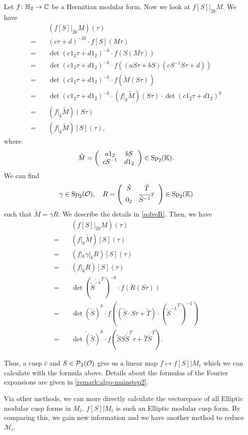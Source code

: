 \begin{prelim}
Let $f \colon \mathbb{H}_2 \rightarrow \mathbb{C}$ be a Hermitian modular form. Now we look at $f[S] |_{2k} M$. We have
\begin{align*}
& (f[S] |_{2k} M) (\tau) \\
=\quad & (c \tau + d)^{-2k} \cdot f[S](M \tau) \\
=\quad & \det(c 1_2 \tau + d 1_2)^{-k} \cdot f(S (M \tau)) \\
=\quad & \det(c 1_2 \tau + d 1_2)^{-k} \cdot f( (a S \tau + b S) ( c S^{-1} S \tau + d) ) \\
=\quad & \det(c 1_2 \tau + d 1_2)^{-k} \cdot f( \tilde{M} (S \tau) ) \\
=\quad & \det(c 1_2 \tau + d 1_2)^{-k} \cdot (f |_k \tilde{M}) (S \tau) \cdot \det(c 1_2 \tau + d 1_2)^{k} \\
=\quad & ( f |_k \tilde{M} ) (S \tau) \\
=\quad & ( f |_k \tilde{M} )[S] (\tau) ,
\end{align*}
where
\[ \tilde{M} = \left( \begin{array}{cc} a1_2 & bS \\ cS^{-1} & d1_2 \end{array} \right) \in \operatorname{Sp}_2(\mathbb{K}) . \]
%
We can find
\[ \gamma \in \operatorname{Sp}_2(\mathcal{O}), \quad R = \left( \begin{array}{cc} \tilde{S} & \tilde{T} \\ 0_2 & \overline{\tilde{S}^{-1}}^T \end{array} \right) \in \operatorname{Sp}_2(\mathbb{K}) \]
such that $\tilde{M} = \gamma R$. We describe the details in \cref{solveR}.
Then, we have
\begin{align*}
& (f[S] |_{2k} M) (\tau) \\
=\quad& ( f |_k \tilde{M} )[S] (\tau) \\
=\quad& ( f |_k \gamma |_k R  )[S] (\tau) \\
=\quad& (f |_k R) [S] (\tau) \\
=\quad& \det\left(\overline{\tilde{S}^{-1}}^T\right)^{-k} \cdot f(R  (S \tau)) \\
=\quad& \overline{\det(\tilde{S})}^k \cdot
f \left(\left(\tilde{S} \cdot S \tau + \tilde{T}\right) \cdot \left(\overline{\tilde{S}^{-1}}^T\right)^{-1}\right) \\
=\quad& \overline{\det(\tilde{S})}^k \cdot f\left( \tilde{S} S \overline{\tilde{S}}^T \tau + \tilde{T} \overline{\tilde{S}}^T \right) .
\end{align*}

Thus, a cusp $\hat{c}$ and $S \in \operatorname{\mathcal{P}}_2(\mathcal{O})$ give us a linear map $f \mapsto f[S] | M_{\hat{c}}$ which we can calculate with the formula above. Details about the formulas of the Fourier expansions are given in \cref{remark:algo-mainstep2}.

Via other methods, we can more directly calculate the vectorspace of all Elliptic modular cusp forms in $M_{\hat{c}}$. $f[S] | M_{\hat{c}}$ is such an Elliptic modular cusp form. By comparing this, we gain new information and we have another method to reduce $\mathcal{M}_i$.
\end{prelim}

